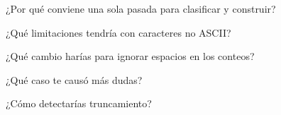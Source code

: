 
\begin{DoxyEnumerate}
\item ¿\+Por qué conviene una sola pasada para clasificar y construir?
\item ¿\+Qué limitaciones tendría con caracteres no ASCII?
\item ¿\+Qué cambio harías para ignorar espacios en los conteos?
\item ¿\+Qué caso te causó más dudas?
\item ¿\+Cómo detectarías truncamiento? 
\end{DoxyEnumerate}